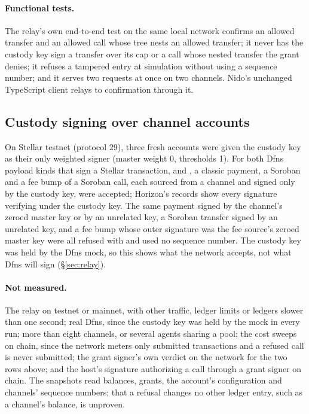 \paragraph{Functional tests.} The relay's own end-to-end test on the same
local network confirms an allowed transfer and an allowed call whose tree
nests an allowed transfer; it never has the custody key sign a transfer over
its cap or a call whose nested transfer the grant denies; it refuses a
tampered entry at simulation without using a sequence number; and it serves
two requests at once on two channels. Nido's
unchanged TypeScript client relays to confirmation
through it.

\subsection{Custody signing over channel accounts}

On Stellar testnet (protocol 29), three fresh accounts were given the custody
key as their only weighted signer (master weight 0, thresholds 1). For both
Dfns payload kinds that sign a Stellar transaction,  and
, a classic payment, a Soroban 
and a fee bump of a Soroban call, each sourced from a channel and signed only
by the custody key, were accepted; Horizon's records show every signature
verifying under the custody key. The same payment signed by the channel's
zeroed master key or by an unrelated key, a Soroban transfer signed by an
unrelated key, and a fee bump whose outer signature was the fee source's
zeroed master key were all refused with  and used no
sequence number. The custody key was held by the Dfns
mock, so this shows what the network accepts, not what Dfns will
sign (\S\ref{sec:relay}).

\paragraph{Not measured.} The relay on testnet or mainnet, with other traffic,
ledger limits or ledgers slower than one second; real Dfns, since the custody
key was held by the mock in every run; more than eight channels, or several
agents sharing a pool; the cost sweeps on chain, since the network meters only
submitted transactions and a refused call is never submitted; the grant
signer's own verdict on the network for the two rows above; and the host's
signature authorizing a call through a grant signer on chain. The snapshots
read balances, grants, the account's configuration and channels' sequence
numbers; that a refusal changes no other ledger entry, such as a channel's
balance, is unproven.
